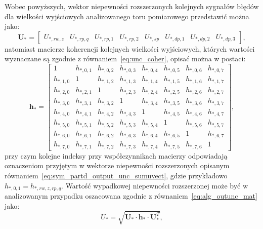 Wobec powyższych, wektor niepewności rozszerzonych kolejnych sygnałów błędów dla wielkości wyjściowych analizowanego toru pomiarowego przedstawić można jako:
\begin{equation}
\mathbf{U}_{*} =
\begin{bmatrix}
U_{*,rw,z} & U_{*,rp,q} & U_{*,rp,1} & U_{*,rp,2} & U_{*,sp} & U_{*,dp,1} & U_{*,dp,2} & U_{*,dp,3}
\end{bmatrix}
\label{eq:sym_partd_output_unc_sumuvect},
\end{equation}
natomiast macierze koherencji kolejnych wielkości wyjściowych, których wartości wyznaczane są zgodnie z równaniem~\eqref{eq:unc_coher}, opisać można w postaci:
\begin{equation}
\mathbf{h}_{*} =
\begin{bmatrix}
1 & h_{*,0,1} & h_{*,0,2} & h_{*,0,3} & h_{*,0,4} & h_{*,0,5} & h_{*,0,6} & h_{*,0,7} \\
h_{*,1,0} & 1 & h_{*,1,2} & h_{*,1,3} & h_{*,1,4} & h_{*,1,5} & h_{*,1,6} & h_{*,1,7} \\
h_{*,2,0} & h_{*,2,1} & 1 & h_{*,2,3} & h_{*,2,4} & h_{*,2,5} & h_{*,2,6} & h_{*,2,7} \\
h_{*,3,0} & h_{*,3,1} & h_{*,3,2} & 1 & h_{*,3,4} & h_{*,3,5} & h_{*,3,6} & h_{*,3,7} \\
h_{*,4,0} & h_{*,4,1} & h_{*,4,2} & h_{*,4,3} & 1 & h_{*,4,5} & h_{*,4,6} & h_{*,4,7} \\
h_{*,5,0} & h_{*,5,1} & h_{*,5,2} & h_{*,5,3} & h_{*,5,4} & 1 & h_{*,5,6} & h_{*,5,7} \\
h_{*,6,0} & h_{*,6,1} & h_{*,6,2} & h_{*,6,3} & h_{*,6,4} & h_{*,6,5} & 1 & h_{*,6,7} \\
h_{*,7,0} & h_{*,7,1} & h_{*,7,2} & h_{*,7,3} & h_{*,7,4} & h_{*,7,5} & h_{*,7,6} & 1
\end{bmatrix}
\label{eq:sym_partd_output_unc_cohermat},
\end{equation}
przy czym kolejne indeksy przy współczynnikach macierzy odpowiadają oznaczeniom przyjętym w wektorze niepewności rozszerzonych opisanym równaniem~\eqref{eq:sym_partd_output_unc_sumuvect}, gdzie przykładowo $h_{*,0,1} = h_{*,rw,z,rp,q}$. Wartość wypadkowej niepewności rozszerzonej może być w analizowanym przypadku oszacowana zgodnie z równaniem~\eqref{eq:alg_outunc_mat} jako:
\begin{equation}
U_{*} = \sqrt{\mathbf{U}_{*} \cdot \mathbf{h}_{*} \cdot \mathbf{U}_{*}^{T}} \label{eq:sym_partd_output_unc_totalmat},
\end{equation}

